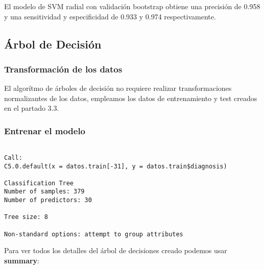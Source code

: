 \documentclass[
]{article}
\newenvironment{Shaded}{\begin{snugshade}}{\end{snugshade}}
\newcommand{\CommentTok}[1]{\textcolor[rgb]{0.56,0.35,0.01}{\textit{#1}}}
\newcommand{\DecValTok}[1]{\textcolor[rgb]{0.00,0.00,0.81}{#1}}
\newcommand{\KeywordTok}[1]{\textcolor[rgb]{0.13,0.29,0.53}{\textbf{#1}}}
\newcommand{\NormalTok}[1]{#1}
\newcommand{\OperatorTok}[1]{\textcolor[rgb]{0.81,0.36,0.00}{\textbf{#1}}}
\newcommand{\StringTok}[1]{\textcolor[rgb]{0.31,0.60,0.02}{#1}}
\begin{document}
El modelo de SVM radial con validación bootstrap obtiene una precisión
de 0.958 y una sensitividad y especificidad de 0.933 y 0.974
respectivamente.

\hypertarget{uxe1rbol-de-decisiuxf3n}{%
\subsection{Árbol de Decisión}\label{uxe1rbol-de-decisiuxf3n}}

\hypertarget{transformaciuxf3n-de-los-datos-4}{%
\subsubsection{Transformación de los
datos}\label{transformaciuxf3n-de-los-datos-4}}

El algorítmo de árboles de decisión no requiere realizar
transformaciones normalizantes de los datos, empleamos los datos de
entrenamiento y test creados en el partado 3.3.

\hypertarget{entrenar-el-modelo-4}{%
\subsubsection{Entrenar el modelo}\label{entrenar-el-modelo-4}}

\begin{Shaded}
\end{Shaded}

\begin{verbatim}

Call:
C5.0.default(x = datos.train[-31], y = datos.train$diagnosis)

Classification Tree
Number of samples: 379 
Number of predictors: 30 

Tree size: 8 

Non-standard options: attempt to group attributes
\end{verbatim}

Para ver todos los detalles del árbol de decisiones creado podemos usar
\textbf{summary}:
\end{document}
